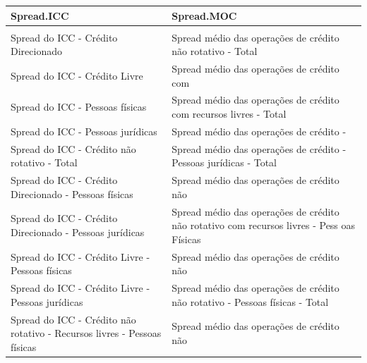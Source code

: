 \documentclass[12pt,12pt,openright,oneside,a4paper,chapter=TITLE,section=TITLE,subsection=TITLE,subsubsection=TITLE,english,french,spanish,portugues,sumario=tradicional]{abntex2}
\begin{document}
\begin{table}
\begingroup\fontsize{10}{12}\selectfont

\begin{tabu} to 
\toprule
Spread.ICC & Spread.MOC\\
\midrule
{} & \\
Spread do ICC - Crédito Direcionado & Spread médio das operações de crédito não rotativo 
                       - Total\\
Spread do ICC - Crédito Livre & Spread médio das operações de crédito com 
\\
Spread do ICC - Pessoas físicas & Spread médio das operações de crédito 
                       com recursos livres - Total\\
Spread do ICC - Pessoas jurídicas & Spread médio das operações de crédito - 
\\
\addlinespace
Spread do ICC - Crédito não rotativo - Total & Spread médio das operações de crédito 
                       - Pessoas jurídicas - Total\\
Spread do ICC - Crédito Direcionado - Pessoas físicas & Spread médio das operações de crédito não 
\\
Spread do ICC - Crédito Direcionado - 
                      Pessoas jurídicas & Spread médio das operações de crédito não rotativo 
                       com recursos livres - Pess oas Físicas\\
Spread do ICC - Crédito Livre - Pessoas físicas & Spread médio das operações de crédito não 
\\
Spread do ICC - Crédito Livre - Pessoas jurídicas & Spread médio das operações de crédito não 
                       rotativo - Pessoas físicas - Total\\
\addlinespace
Spread do ICC - Crédito não rotativo 
                      - Recursos livres - Pessoas físicas & Spread médio das operações de crédito não 
\\

\end{tabu}
\end{table}
\end{document}
